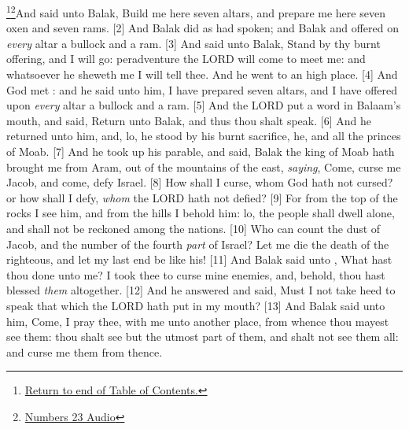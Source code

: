 \footnote{\textcolor[rgb]{0.00,0.25,0.00}{\hyperlink{NumbersTOC}{Return to end of Table of Contents.}}}\footnote{\href{https://audiobible.com/bible/numbers_23.html}{\textcolor[cmyk]{0.99998,1,0,0}{Numbers 23 Audio}}}\textcolor[cmyk]{0.99998,1,0,0}{And  said unto Balak, Build me here seven altars, and prepare me here seven oxen and seven rams.}
[2] \textcolor[cmyk]{0.99998,1,0,0}{And Balak did as  had spoken; and Balak and  offered on \emph{every} altar a bullock and a ram.}
[3] \textcolor[cmyk]{0.99998,1,0,0}{And  said unto Balak, Stand by thy burnt offering, and I will go: peradventure the LORD will come to meet me: and whatsoever he sheweth me I will tell thee. And he went to an high place.}
[4] \textcolor[cmyk]{0.99998,1,0,0}{And God met : and he said unto him, I have prepared seven altars, and I have offered upon \emph{every} altar a bullock and a ram.}
[5] \textcolor[cmyk]{0.99998,1,0,0}{And the LORD put a word in Balaam's mouth, and said, Return unto Balak, and thus thou shalt speak.}
[6] \textcolor[cmyk]{0.99998,1,0,0}{And he returned unto him, and, lo, he stood by his burnt sacrifice, he, and all the princes of Moab.}
[7] \textcolor[cmyk]{0.99998,1,0,0}{And he took up his parable, and said, Balak the king of Moab hath brought me from Aram, out of the mountains of the east, \emph{saying}, Come, curse me Jacob, and come, defy Israel.}
[8] \textcolor[cmyk]{0.99998,1,0,0}{How shall I curse, whom God hath not cursed? or how shall I defy, \emph{whom} the LORD hath not defied?}
[9] \textcolor[cmyk]{0.99998,1,0,0}{For from the top of the rocks I see him, and from the hills I behold him: lo, the people shall dwell alone, and shall not be reckoned among the nations.}
[10] \textcolor[cmyk]{0.99998,1,0,0}{Who can count the dust of Jacob, and the number of the fourth \emph{part} of Israel? Let me die the death of the righteous, and let my last end be like his!}
[11] \textcolor[cmyk]{0.99998,1,0,0}{And Balak said unto , What hast thou done unto me? I took thee to curse mine enemies, and, behold, thou hast blessed \emph{them} altogether.}
[12] \textcolor[cmyk]{0.99998,1,0,0}{And he answered and said, Must I not take heed to speak that which the LORD hath put in my mouth?}
[13] \textcolor[cmyk]{0.99998,1,0,0}{And Balak said unto him, Come, I pray thee, with me unto another place, from whence thou mayest see them: thou shalt see but the utmost part of them, and shalt not see them all: and curse me them from thence.}\\
